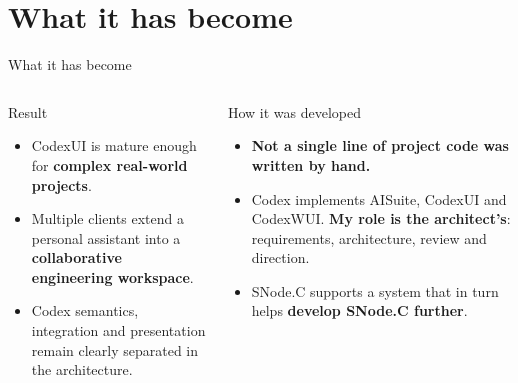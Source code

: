 \documentclass[\fhformat,10pt]{fh-ooe}
\begin{document}
\section{What it has become}
\begin{frame}{What it has become}
\centering
{}
\vspace{0.3em}
\small
\begin{columns}[T]
\begin{block}{Result}
\begin{itemize}
  \item CodexUI is mature enough for \textbf{complex real-world projects}.
  \item Multiple clients extend a personal assistant into a \textbf{collaborative engineering workspace}.
  \item Codex semantics, integration and presentation remain clearly separated in the architecture.
\end{itemize}
\end{block}
\begin{block}{How it was developed}
\begin{itemize}
  \item \textbf{Not a single line of project code was written by hand.}
  \item Codex implements AISuite, CodexUI and CodexWUI. \textbf{My role is the architect's}: requirements, architecture, review and direction.
  \item SNode.C supports a system that in turn helps \textbf{develop SNode.C further}.
\end{itemize}
\end{block}
\end{columns}
\end{frame}
\end{document}
